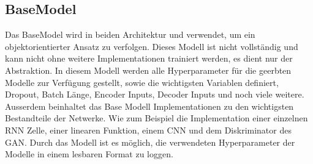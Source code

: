 \subsection{BaseModel}
\label{sub:base_model}
Das BaseModel wird in beiden Architektur  und  verwendet, um ein
objektorientierter Ansatz zu verfolgen. Dieses Modell ist nicht vollständig und kann nicht ohne weitere Implementationen
trainiert werden, es dient nur der Abstraktion. In diesem Modell werden alle Hyperparameter für die geerbten Modelle zur
Verfügung gestellt, sowie die wichtigsten Variablen definiert, Dropout, Batch Länge, Encoder Inputs, Decoder Inputs und
noch viele weitere. Ausserdem beinhaltet das Base Modell Implementationen zu den wichtigsten Bestandteile der Netwerke.
Wie zum Beispiel die Implementation einer einzelnen \gls{RNN} Zelle, einer linearen Funktion, einem \gls{CNN} und dem
Diskriminator des \gls{GAN}. Durch das Modell ist es möglich, die verwendeten Hyperparameter der Modelle in einem
lesbaren Format zu loggen.

